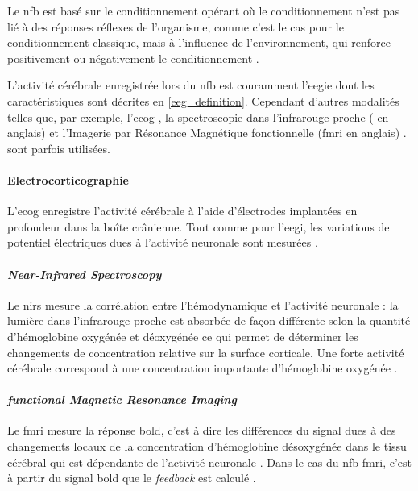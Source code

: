 Le \gls{nfb} est basé sur le conditionnement opérant \citep{Reynolds1975} où le conditionnement n'est pas lié à 
des réponses réflexes de l'organisme, comme c'est le cas pour le conditionnement classique, mais à l'influence de l'environnement, qui 
renforce positivement ou négativement le conditionnement \citep{Skinner1948}. 

L'activité cérébrale enregistrée lors du \gls{nfb} est couramment l'\gls{eegie} dont les caractéristiques sont décrites en \ref{eeg_definition}.
Cependant d'autres modalités telles que, par exemple, 
l'\gls{ecog} \citep{Khanna2016, Gharabaghi2014}, la spectroscopie dans l'infrarouge proche ( en anglais) \citep{Marx2015} et 
l'Imagerie par Résonance Magnétique fonctionnelle (\gls{fmri} en anglais) \citep{Sulzer2013}.
sont parfois utilisées. 

\paragraph{Electrocorticographie} 
L'\gls{ecog} enregistre l'activité cérébrale à l'aide d'électrodes implantées en profondeur dans la boîte crânienne. Tout comme pour l'\gls{eegi}, 
les variations de potentiel électriques dues à l'activité neuronale sont mesurées \citep{Leuthardt2006}. 

\paragraph{\textit{Near-Infrared Spectroscopy}} 
Le \gls{nirs} mesure la corrélation entre l'hémodynamique et l'activité neuronale : la lumière dans l'infrarouge proche est absorbée de
façon différente selon la quantité d'hémoglobine oxygénée et déoxygénée ce qui permet de déterminer les changements de concentration relative
sur la surface corticale. Une forte activité cérébrale correspond à une concentration importante d'hémoglobine oxygénée \citep{Fallgatter1997, Marx2015}. 

\paragraph{\textit{functional Magnetic Resonance Imaging}} 
Le \gls{fmri} mesure la réponse \gls{bold}, c'est à dire les différences du signal dues à des changements locaux de la concentration d'hémoglobine désoxygénée 
dans le tissu cérébral qui est dépendante de l'activité neuronale \citep{Dewiputri2013}. Dans le cas du \gls{nfb}-\gls{fmri}, c'est à partir du signal 
\gls{bold} que le \textit{feedback} est calculé \citep{Dewiputri2013}. 

